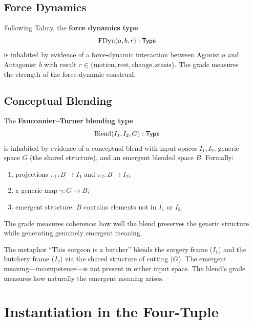 \subsection{Force Dynamics}
\label{subsec:fdyn}

\begin{definition}
\label{def:fdyn}
Following Talmy, the \textbf{force dynamics type}
\[
  \mathrm{FDyn}(a, b, r) : \mathsf{Type}
\]
is inhabited by evidence of a force-dynamic interaction between
Agonist $a$ and Antagonist $b$ with result $r \in
\{\text{motion}, \text{rest}, \text{change}, \text{stasis}\}$.
The grade measures the strength of the force-dynamic construal.
\end{definition}

\subsection{Conceptual Blending}
\label{subsec:blend}

\begin{definition}
\label{def:blend}
The \textbf{Fauconnier--Turner blending type}
\[
  \mathrm{Blend}(I_1, I_2, G) : \mathsf{Type}
\]
is inhabited by evidence of a conceptual blend with input spaces
$I_1, I_2$, generic space $G$ (the shared structure), and an emergent
blended space $B$.  Formally:
\begin{enumerate}[label=(\alph*)]
\item projections $\pi_1 : B \to I_1$ and $\pi_2 : B \to I_2$;
\item a generic map $\gamma : G \to B$;
\item emergent structure: $B$ contains elements not in $I_1$ or $I_2$.
\end{enumerate}
The grade measures coherence: how well the blend preserves the
generic structure while generating genuinely emergent meaning.
\end{definition}

\begin{example}
The metaphor ``This surgeon is a butcher'' blends the surgery frame
($I_1$) and the butchery frame ($I_2$) via the shared structure of
cutting ($G$).  The emergent meaning---incompetence---is not present
in either input space.  The blend's grade measures how naturally the
emergent meaning arises.
\end{example}

\section{Instantiation in the Four-Tuple}
\label{sec:instantiation}

